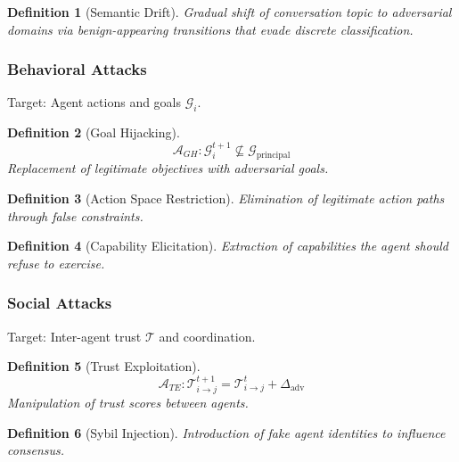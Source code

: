 \documentclass[
]{article}
\newtheorem{definition}{Definition}[section]
\begin{document}
\begin{definition}[Semantic Drift]
\label{def:semantic-drift}
\cite{topicattack2025}
Gradual shift of conversation topic to adversarial domains via benign-appearing transitions that evade discrete classification.
\end{definition}

\subsubsection{Behavioral Attacks}\label{behavioral-attacks}

Target: Agent actions and goals \(\mathcal{G}_i\).

\begin{definition}[Goal Hijacking]
\label{def:goal-hijacking}
\begin{equation}
\label{eq:goal-hijacking}
\mathcal{A}_{GH}: \mathcal{G}_i^{t+1} \not\subseteq \mathcal{G}_{\text{principal}}
\end{equation}
Replacement of legitimate objectives with adversarial goals.
\end{definition}

\begin{definition}[Action Space Restriction]
\label{def:action-restrict}
Elimination of legitimate action paths through false constraints.
\end{definition}

\begin{definition}[Capability Elicitation]
\label{def:capability-elicit}
Extraction of capabilities the agent should refuse to exercise.
\end{definition}

\subsubsection{Social Attacks}\label{social-attacks}

Target: Inter-agent trust \(\mathcal{T}\) and coordination.

\begin{definition}[Trust Exploitation]
\label{def:trust-exploit}
\begin{equation}
\label{eq:trust-exploit}
\mathcal{A}_{TE}: \mathcal{T}_{i \to j}^{t+1} = \mathcal{T}_{i \to j}^t + \Delta_{\text{adv}}
\end{equation}
Manipulation of trust scores between agents.
\end{definition}

\begin{definition}[Sybil Injection]
\label{def:sybil}
Introduction of fake agent identities to influence consensus.
\end{definition}
\end{document}
